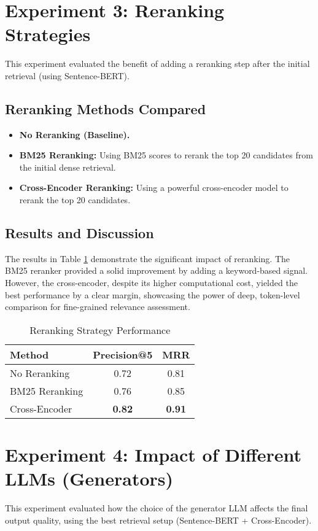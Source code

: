 \section{Experiment 3: Reranking Strategies}
\label{sec:exp_reranking}
This experiment evaluated the benefit of adding a reranking step after the initial retrieval (using Sentence-BERT).
\subsection{Reranking Methods Compared}
\begin{itemize}
    \item \textbf{No Reranking (Baseline).}
    \item \textbf{BM25 Reranking:} Using BM25 scores to rerank the top 20 candidates from the initial dense retrieval.
    \item \textbf{Cross-Encoder Reranking:} Using a powerful cross-encoder model to rerank the top 20 candidates.
\end{itemize}
\subsection{Results and Discussion}
The results in Table \ref{tab:reranking_results} demonstrate the significant impact of reranking. The BM25 reranker provided a solid improvement by adding a keyword-based signal. However, the cross-encoder, despite its higher computational cost, yielded the best performance by a clear margin, showcasing the power of deep, token-level comparison for fine-grained relevance assessment.

\begin{table}[h!]
\centering
\caption{Reranking Strategy Performance}
\label{tab:reranking_results}
\begin{tabular}{|l|c|c|}
\hline
\textbf{Method} & \textbf{Precision@5} & \textbf{MRR} \\
\hline
No Reranking & 0.72 & 0.81 \\
BM25 Reranking & 0.76 & 0.85 \\
Cross-Encoder & \textbf{0.82} & \textbf{0.91} \\
\hline
\end{tabular}
\end{table}

\section{Experiment 4: Impact of Different LLMs (Generators)}
\label{sec:exp_llm_choice}
This experiment evaluated how the choice of the generator LLM affects the final output quality, using the best retrieval setup (Sentence-BERT + Cross-Encoder).

